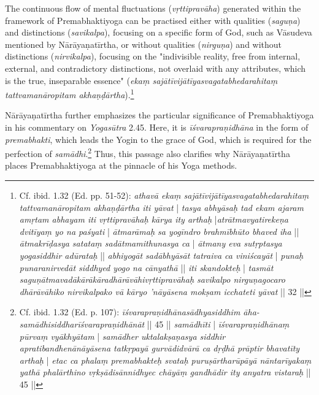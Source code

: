 The continuous flow of mental fluctuations (\textit{vṛttipravāha}) generated within the framework of Premabhaktiyoga can be practised either with qualities (\textit{saguṇa}) and distinctions (\textit{savikalpa}), focusing on a specific form of God, such as Vāsudeva mentioned by Nārāyaṇatīrtha, or without qualities (\textit{nirguṇa}) and without distinctions (\textit{nirvikalpa}), focusing on the "indivisible reality, free from internal, external, and contradictory distinctions, not overlaid with any attributes, which is the true, inseparable essence" (\textit{ekaṃ sajātīvijātīyasvagatabhedarahitaṃ tattvamanāropitam akhaṇḍārtha}).\footnote{Cf. ibid. 1.32 (Ed. pp. 51-52): \textit{athavā ekaṃ sajātīvijātīyasvagatabhedarahitaṃ tattvamanāropitam akhaṇḍārtha iti yāvat} | \textit{tasya abhyāsaḥ tad ekam ajaram amṛtam abhayam iti vṛttipravāhaḥ kārya ity arthaḥ} |\textit{atrātmavyatirekeṇa dvitīyaṃ yo na paśyati} | \textit{ātmarāmaḥ sa yogīndro brahmībhūto bhaved iha} || \textit{ātmakrīḍasya satataṃ sadātmamithunasya ca} | \textit{ātmany eva sutṛptasya yogasiddhir adūrataḥ} || \textit{abhiyogāt sadābhyāsāt tatraiva ca viniścayāt} | \textit{punaḥ punaranirvedāt siddhyed yogo na cānyathā} || \textit{iti skandokteḥ} | \textit{tasmāt saguṇātmavadākārākāradhārāvāhivṛttipravāhaḥ savikalpo nirguṇagocaro dhārāvāhiko nirvikalpako vā kāryo 'nāyāsena mokṣam icchateti yāvat} || 32 ||}

Nārāyaṇatīrtha further emphasizes the particular significance of Premabhaktiyoga in his commentary on \textit{Yogasūtra} 2.45. Here, it is \textit{īśvarapraṇidhāna} in the form of \textit{premabhakti}, which leads the Yogin to the grace of God, which is required for the perfection of \textit{samādhi}.\footnote{Cf. ibid. 1.32 (Ed. p. 107): \textit{īśvarapraṇidhānasādhyasiddhim āha- samādhisiddharīśvarapraṇidhānāt} || 45 || \textit{samādhīti} | \textit{īśvarapraṇidhānaṃ pūrvaṃ vyākhyātam} | \textit{samādher uktalakṣaṇasya siddhir apratibandhenānāyāsena tatkṛpayā gurvādidvārā ca dṛḍhā prāptir bhavatīty arthaḥ} | \textit{etac ca phalaṃ premabhakteḥ svataḥ puruṣārtharūpāyā nāntarīyakaṃ yathā phalārthino vṛkṣādisānnidhyec chāyāṃ gandhādir ity anyatra vistaraḥ} || 45 ||} Thus, this passage also clarifies why Nārāyaṇatīrtha places Premabhaktiyoga at the pinnacle of his Yoga methods.


